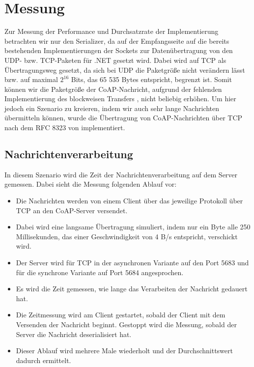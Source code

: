 \section{Messung}
\label{sec:messung}

Zur Messung der Performance und Durchsatzrate der Implementierung betrachten wir nur den Serializer, da auf der Empfangsseite auf die bereits bestehenden Implementierungen der Sockets zur Datenübertragung von den UDP- bzw. TCP-Paketen für .NET gesetzt wird. Dabei wird auf TCP als Übertragungsweg gesetzt, da sich bei UDP die Paketgröße nicht verändern lässt bzw. auf maximal $2^{16}$ Bits, das 65 535 Bytes entspricht, begrenzt ist. Somit können wir die Paketgröße der CoAP-Nachricht, aufgrund der fehlenden Implementierung des blockweisen Transfers \autocite{RFC7959}, nicht beliebig erhöhen. Um hier jedoch ein Szenario zu kreieren, indem wir auch sehr lange Nachrichten übermitteln können, wurde die Übertragung von CoAP-Nachrichten über TCP nach dem RFC 8323 von \citeauthor{RFC8323} \cite{RFC8323} implementiert.

\subsection{Nachrichtenverarbeitung}
\label{subsec:nachrichtenverarbeitung}

In diesem Szenario wird die Zeit der Nachrichtenverarbeitung auf dem Server gemessen. Dabei sieht die Messung folgenden Ablauf vor:
\begin{itemize}
    \item Die Nachrichten werden von einem Client über das jeweilige Protokoll über TCP an den CoAP-Server versendet.
    \item Dabei wird eine langsame Übertragung simuliert, indem nur ein Byte alle 250 Millisekunden, das einer Geschwindigkeit von 4 B/s entspricht, verschickt wird.
    \item Der Server wird für TCP in der asynchronen Variante auf den Port 5683 und für die synchrone Variante auf Port 5684 angesprochen.
    \item Es wird die Zeit gemessen, wie lange das Verarbeiten der Nachricht gedauert hat.
    \item Die Zeitmessung wird am Client gestartet, sobald der Client mit dem Versenden der Nachricht beginnt. Gestoppt wird die Messung, sobald der Server die Nachricht deserialisiert hat.
    \item Dieser Ablauf wird mehrere Male wiederholt und der Durchschnittswert dadurch ermittelt.
\end{itemize}


